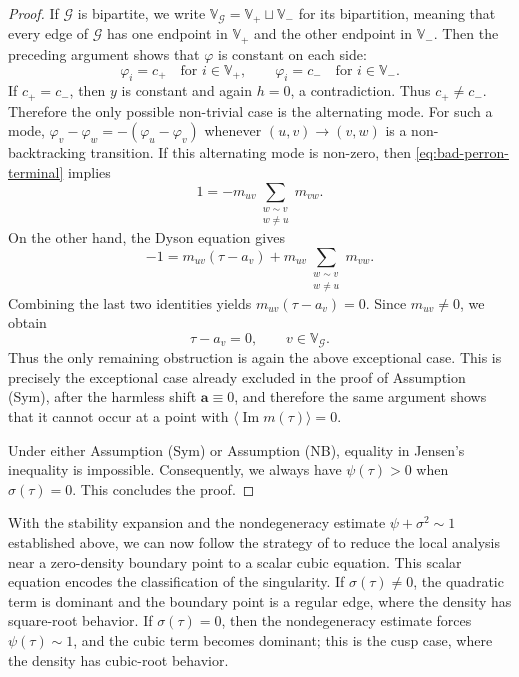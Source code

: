 \documentclass[11pt,twoside, a4paper]{article}
\numberwithin{equation}{section}
\numberwithin{figure}{section}
\theoremstyle{plain} %
\theoremstyle{definition}
\theoremstyle{remark}
\newcommand{\1} {\mspace{1 mu}}
\newcommand{\2} {\mspace{2 mu}}
\DeclareMathOperator{\im}{Im}
\begin{document}
\begin{proof}
    If $\mathcal G$ is bipartite, we write
    $
    \mathbb V_{\mathcal G}=\mathbb V_+\sqcup \mathbb V_-
    $
    for its bipartition, meaning that every edge of $\mathcal G$ has one endpoint in $\mathbb V_+$ and the other endpoint in $\mathbb V_-$. Then the preceding
    argument shows that \(\varphi\) is constant on each side:
    \[  
        \varphi_i=c_+\quad\text{for }i\in\mathbb V_+,
        \qquad
        \varphi_i=c_-\quad\text{for }i\in\mathbb V_-.
    \]
    If \(c_+=c_-\), then \(y\) is constant and again \(h=0\), a contradiction. Thus $c_+\neq c_-$. Therefore the only possible non-trivial case is the alternating mode.
    For such a mode,
    $
        \varphi_v-\varphi_w=-(\varphi_u-\varphi_v)
    $
    whenever \((u,v)\to(v,w)\) is a non-backtracking transition.  If this
    alternating mode is non-zero, then \eqref{eq:bad-perron-terminal} implies
    \[
        1
        =
        -m_{uv}\sum_{\substack{w\sim v\\ w\ne u}}m_{vw}.
    \]
    On the other hand, the Dyson equation gives
    \[
        -1
        =
        m_{uv}(\tau-a_v)
        +
        m_{uv}\sum_{\substack{w\sim v\\ w\ne u}}m_{vw}.
    \]
    Combining the last two identities yields
    $
        m_{uv}(\tau-a_v)=0 .
    $
    Since \(m_{uv}\ne0\), we obtain
    \[
        \tau-a_v=0,
        \qquad  v\in \mathbb{V}_{\mathcal G}.
    \]
    Thus the only remaining obstruction is again the above exceptional case.
    This is precisely the exceptional case already excluded in the proof of
    Assumption (Sym), after the harmless shift \(\mathbf a\equiv0\), and therefore the same
    argument shows that it cannot occur at a point with
    \(\langle \im m(\tau)\rangle=0\).

    \medskip
    Under either Assumption (Sym) or Assumption (NB), equality in Jensen's
    inequality is impossible. Consequently, we always have \(\psi(\tau)>0\) when $\sigma(\tau)=0$.
    This concludes the proof.

\end{proof}


    



With the stability expansion and the nondegeneracy estimate
\(\psi+\sigma^2\sim1\) established above, we can now follow the strategy of
\cite{AEK2017singularities} to reduce the local analysis near a zero-density
boundary point to a scalar cubic equation. 
This scalar equation encodes the classification of the singularity. If
\(\sigma(\tau)\ne0\), the quadratic term is dominant and the boundary point is a
regular edge, where the density has square-root behavior. If
\(\sigma(\tau)=0\), then the nondegeneracy estimate forces
\(\psi(\tau)\sim1\), and the cubic term becomes dominant; this is the cusp case,
where the density has cubic-root behavior.
\end{document}
